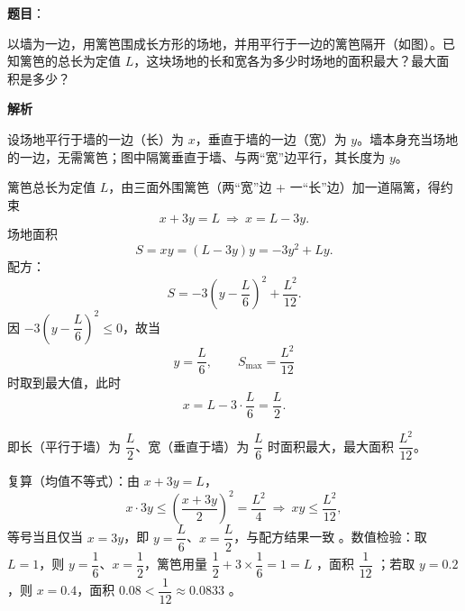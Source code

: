 \begin{answer}

\textbf{题目}：

以墙为一边，用篱笆围成长方形的场地，并用平行于一边的篱笆隔开（如图）。已知篱笆的总长为定值 $L$，这块场地的长和宽各为多少时场地的面积最大？最大面积是多少？
\nopagebreak[4]
\begin{center}\end{center}
\nopagebreak[4]
\textbf{解析}
\nopagebreak[4]
\begin{center}\end{center}
\nopagebreak[4]
设场地平行于墙的一边（长）为 $x$，垂直于墙的一边（宽）为 $y$。墙本身充当场地的一边，无需篱笆；图中隔篱垂直于墙、与两“宽”边平行，其长度为 $y$。

篱笆总长为定值 $L$，由三面外围篱笆（两“宽”边 + 一“长”边）加一道隔篱，得约束
\nopagebreak[4]
\[
x+3y=L\ \Longrightarrow\ x=L-3y.
\]
场地面积
\nopagebreak[4]
\[
S=xy=(L-3y)y=-3y^2+Ly.
\]
配方：
\nopagebreak[4]
\[
S=-3\left(y-\frac L6\right)^2+\frac{L^2}{12}.
\]
因 $-3\left(y-\dfrac L6\right)^2\le0$，故当
\nopagebreak[4]
\[
y=\frac L6,\qquad S_{\max}=\frac{L^2}{12}
\]
时取到最大值，此时
\nopagebreak[4]
\[
x=L-3\cdot\frac L6=\frac L2.
\]

即长（平行于墙）为 $\dfrac L2$、宽（垂直于墙）为 $\dfrac L6$ 时面积最大，最大面积 $\dfrac{L^2}{12}$。

复算（均值不等式）：由 $x+3y=L$，
\nopagebreak[4]
\[
x\cdot3y\le\left(\frac{x+3y}{2}\right)^2=\frac{L^2}{4}
\ \Longrightarrow\ xy\le\frac{L^2}{12},
\]
等号当且仅当 $x=3y$，即 $y=\dfrac L6$、$x=\dfrac L2$，与配方结果一致 。数值检验：取 $L=1$，则 $y=\dfrac16$、$x=\dfrac12$，篱笆用量 $\dfrac12+3\times\dfrac16=1=L$ ，面积 $\dfrac1{12}$ ；若取 $y=0.2$，则 $x=0.4$，面积 $0.08<\dfrac1{12}\approx0.0833$ 。


\end{answer}
